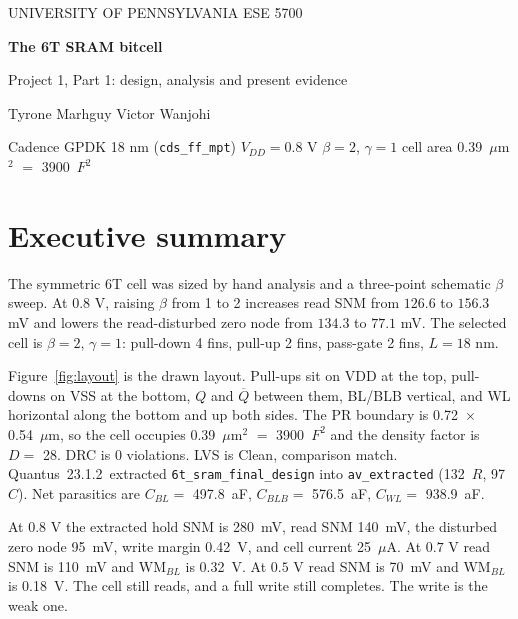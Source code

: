 \documentclass[10pt,letterpaper]{article}
\newcommand{\cellW}{0.72}           %
\newcommand{\cellH}{0.54}           %
\newcommand{\cellAreaUm}{0.39}      %
\newcommand{\cellAreaF}{3900}       %
\newcommand{\densityD}{28}          %
\newcommand{\drcResult}{0 violations} %
\newcommand{\lvsResult}{Clean, comparison match}
\newcommand{\qrcVer}{23.1.2}
\newcommand{\qrcR}{132}             %
\newcommand{\qrcC}{97}              %
\newcommand{\qrcView}{av\_extracted}
\newcommand{\qrcCell}{6t\_sram\_final\_design}
\newcommand{\cBL}{497.8}            %
\newcommand{\cBLB}{576.5}           %
\newcommand{\cWL}{938.9}            %
\newcommand{\snmHold}{280}          %
\newcommand{\snmReadPL}{140}        %
\newcommand{\vZeroPL}{95}           %
\newcommand{\wmBL}{0.42}            %
\newcommand{\iCell}{25}             %
\newcommand{\snmReadSeven}{110}\newcommand{\wmSeven}{0.32}
\newcommand{\snmReadFive}{70}\newcommand{\wmFive}{0.18}
\begin{document}
\begin{center}
{\small UNIVERSITY OF PENNSYLVANIA \quad ESE 5700}\par\vspace{8pt}
{\Huge\bfseries The 6T SRAM bitcell}\par\vspace{4pt}
{\large Project 1, Part 1: design, analysis and present evidence}\par\vspace{10pt}
Tyrone Marhguy \quad\textbullet\quad Victor Wanjohi\par\vspace{8pt}
\colorbox{pale}{\parbox{.93\linewidth}{\small\centering Cadence GPDK 18 nm (\texttt{cds\_ff\_mpt}) \quad $V_{DD}=0.8$ V \quad $\beta=2$, $\gamma=1$ \quad cell area \cellAreaUm\ $\mu$m$^2$ $=$ \cellAreaF\ $F^2$}}
\end{center}

\section*{Executive summary}
The symmetric 6T cell was sized by hand analysis and a three-point schematic $\beta$ sweep. At $0.8$ V, raising $\beta$ from 1 to 2 increases read SNM from $126.6$ to $156.3$ mV and lowers the read-disturbed zero node from $134.3$ to $77.1$ mV. The selected cell is $\beta=2$, $\gamma=1$: pull-down 4 fins, pull-up 2 fins, pass-gate 2 fins, $L=18$ nm.

Figure~\ref{fig:layout} is the drawn layout. Pull-ups sit on VDD at the top, pull-downs on VSS at the bottom, $Q$ and $\overline Q$ between them, BL/BLB vertical, and WL horizontal along the bottom and up both sides. The PR boundary is \cellW\ $\times$ \cellH\ $\mu$m, so the cell occupies \cellAreaUm\ $\mu$m$^2$ $=$ \cellAreaF\ $F^2$ and the density factor is $D=$ \densityD. DRC is \drcResult. LVS is \lvsResult. Quantus~\qrcVer\ extracted \texttt{\qrcCell} into \texttt{\qrcView} (\qrcR\ $R$, \qrcC\ $C$). Net parasitics are $C_{BL}=$ \cBL\ aF, $C_{BLB}=$ \cBLB\ aF, $C_{WL}=$ \cWL\ aF.

At $0.8$ V the extracted hold SNM is \snmHold\ mV, read SNM \snmReadPL\ mV, the disturbed zero node \vZeroPL\ mV, write margin \wmBL\ V, and cell current \iCell\ $\mu$A. At $0.7$ V read SNM is \snmReadSeven\ mV and $\mathrm{WM}_{BL}$ is \wmSeven\ V. At $0.5$ V read SNM is \snmReadFive\ mV and $\mathrm{WM}_{BL}$ is \wmFive\ V. The cell still reads, and a full write still completes. The write is the weak one.
\end{document}
